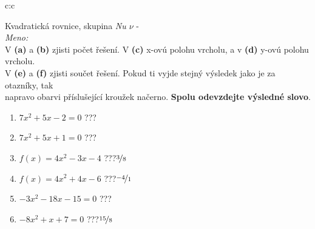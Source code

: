 \documentclass[10pt]{report}
\begin{document}
\clearpage
\thispagestyle{empty}
\begin{tabular}{c:c}
\begin{minipage}[c][99mm][t]{0.49\linewidth}
\begin{center}
\vspace{7mm}
{\huge Kvadratická rovnice, skupina \textit{Nu $\nu$} -}\\[4.5mm]
\textit{Meno:}\phantom{xxxxxxxxxxxxxxxxxxxxxxxxxxxxxxxxxxxxxxxxxxxxxxxxxxxxxxxxxxxxxxxxx}\\[3.5mm]
V \textbf{(a)} a \textbf{(b)} zjisti počet řešení. V \textbf{(c)} x-ovú polohu vrcholu, a v \textbf{(d)} y-ovú polohu vrcholu.\\V \textbf{(e)} a \textbf{(f)} zjisti součet řešení. Pokud ti vyjde stejný výsledek jako je za otazníky, tak\\napravo obarvi příslušející kroužek načerno. \textbf{Spolu odevzdejte výsledné slovo}.\\[3mm]
\begin{minipage}{0.77\linewidth}
\begin{center}
\begin{varwidth}{\textwidth}
\begin{enumerate}
\large
\item $7x^2+5x-2=0$\quad \dotfill\; ???\;\dotfill {}
\item $7x^2+5x+1=0$\quad \dotfill\; ???\;\dotfill {}
\item $f(x)=4x^2-3x-4$\quad \dotfill\; ???\;\dotfill \quad $\nicefrac{3}{8}$
\item $f(x)=4x^2+4x-6$\quad \dotfill\; ???\;\dotfill \quad $\nicefrac{-4}{1}$
\item $-3x^2-18x-15=0$\quad \dotfill\; ???\;\dotfill {}
\item $-8x^2+x+7=0$\quad \dotfill\; ???\;\dotfill \quad $\nicefrac{15}{8}$
\end{enumerate}
\end{varwidth}
\end{center}
\end{minipage}

\end{center}
\end{minipage}
\end{tabular}
\end{document}
